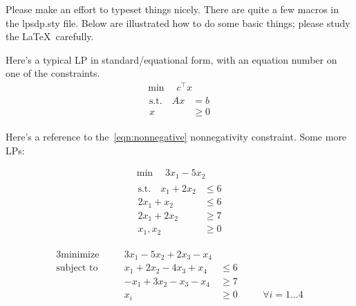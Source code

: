 Please make an effort to typeset things nicely.  There are quite a few macros in the lpsdp.sty file.  Below are illustrated how to do some basic things; please study the \LaTeX\ carefully.

Here's a typical LP in standard/equational form, with an equation number on one of the constraints.
\begin{gather}
    \min \quad c^\top x                       \nonumber\\
    \begin{align}
        \text{s.t.} \quad   Ax &= b           \nonumber\\
                             x &\geq 0       \label{eqn:nonnegative}
    \end{align}
\end{gather}

\noindent Here's a reference to the~\eqref{eqn:nonnegative} nonnegativity constraint.  Some more LPs:

\begin{gather*}
    \min \quad 3x_1 - 5x_2 \\
    \begin{aligned}
        \text{s.t.} \quad   x_1 + 2x_2 &\leq 6\\
                            2x_1 + x_2 &\leq 6\\
                            2x_1 + 2x_2 &\geq 7\\
                            x_1,x_2 &\geq 0
    \end{aligned}
\end{gather*}

\begin{alignat*}{3}
    \text{minimize}&   \quad & 3x_1 - 5x_2 + 2x_3 - x_4&       & &\\
    \text{subject to}& \quad & x_1 + 2x_2 - 4x_3 + x_4 &\leq 6 & &\\
                           & & -x_1 + 3x_2 - x_3 - x_4 &\geq 7 & &\\
                           & & x_i &\geq 0  & &\quad \forall i = 1\dots 4
\end{alignat*}


